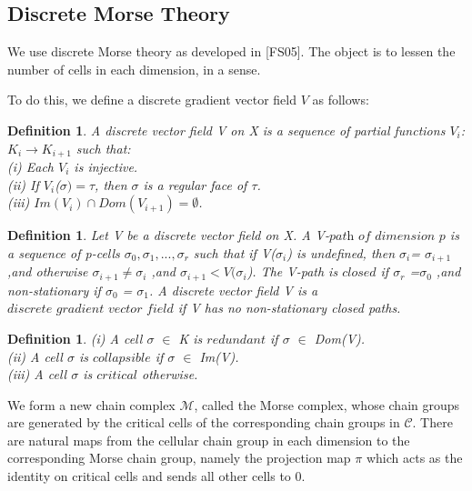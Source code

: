 \documentclass{amsart}
\newtheorem{Definition}[theorem]{Definition}
\begin{document}
\subsection{Discrete Morse Theory}
We use discrete Morse theory as developed in [FS05]. The object is to lessen the number of cells in each dimension, in a sense. 

To do this, we define a discrete gradient vector field $V$ as follows:
\begin{Definition}
A discrete vector field V on X is a sequence of partial functions ${V_{i}}$:${K_{i}}$$\to$$ {K_{i+1}}$ such that:\\
(i) Each $V_{i}$ is injective.\\
(ii) If $V_{i}$($\sigma) = \tau$, then $\sigma$ is a regular face of $\tau$.\\
(iii) $Im(V_{i}) \cap Dom(V_{i+1}) = \emptyset$.

\end{Definition}

\begin{Definition}
Let V be a discrete vector field on X. A V-$\textit{path of dimension p}$ is a sequence of p-cells $\sigma_{0},\sigma_{1},...,\sigma_{r} $ 
such that if V($\sigma_{i}$) is undefined, then $\sigma_{i}$= $\sigma_{i+1}$,and otherwise $\sigma_{i+1}\neq \sigma_{i}$ ,and $\sigma_{i+1}<V($$\sigma_{i}$). The V-path is $\textit{closed}$ if $\sigma_{r}$ =$\sigma_{0}$ ,and non-stationary if $\sigma_{0}$ = $\sigma_{1}$. A discrete vector field V is a $\textit{discrete gradient
vector field}$ if V has no non-stationary closed paths.
\end{Definition}

\begin{Definition}
(i) A cell $\sigma$ $\in$ K is $\textit{redundant}$ if  $\sigma$ $\in$ Dom(V).\\
(ii) A cell $\sigma$ is $\textit{collapsible}$ if  $\sigma$ $\in$ Im(V).\\
(iii) A cell  $\sigma$ is $\textit{critical}$ otherwise. 

\end{Definition}

We form a new chain complex $\mathcal{M}$, called the Morse complex, whose chain groups are generated by the critical cells of the corresponding chain groups in $\mathcal{C}$. There are natural maps from the cellular chain group in each dimension to the corresponding Morse chain group, namely the projection map $\pi$ which acts as the identity on critical cells and sends all other cells to 0.
\end{document}
